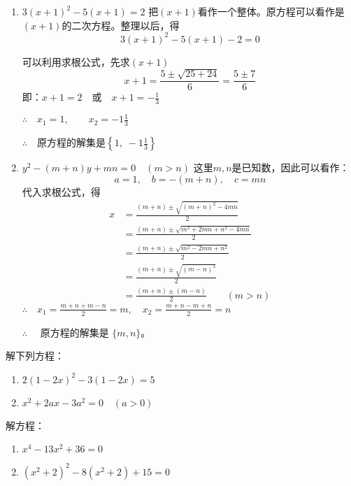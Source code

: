\begin{solution}
\begin{enumerate}
    \item $3(x+1)^2-5(x+1)=2$
    把$(x+1)$看作一个整体。原方程可以看作是
    $(x+1)$的二次方程。整理以后，得
   \[3(x+1)^2-5(x+1)-2=0\] 

   可以利用求根公式，先求$(x+1)$
\[x+1=\frac{5\pm \sqrt{25+24}}{6}=\frac{5\pm 7}{6}\]
即：$x+1=2\quad \text{或}\quad x+1=-\frac{1}{3}$

$\therefore\quad x_1=1,\qquad x_2=-1\frac{1}{3}$

$\therefore\quad$原方程的解集是$\left\{1,\; -1\frac{1}{3}\right\}$

\item $y^2-(m+n)y+mn=0\quad (m>n)$
这里$m,n$是已知数，因此可以看作：
\[a=1,\quad b=-(m+n),\quad c=mn\]
代入求根公式，得
\[\begin{split}
        x &=\frac{(m+n) \pm \sqrt{(m+n)^{2}-4 m n}}{2} \\
        &=\frac{(m+n) \pm \sqrt{m^{2}+2 m n+n^{2}-4 m n}}{2} \\
        &=\frac{(m+n) \pm \sqrt{m^{2}-2 m n+n^{2}}}{2} \\
        &=\frac{(m+n) \pm \sqrt{(m-n)^{2}}}{2}\\
        &=\frac{(m+n) \pm(m-n)}{2} \qquad (m>n)
\end{split}\]
$\therefore\quad x_1=\frac{m+n+m-n}{2}=m,\quad x_2=\frac{m+n-m+n}{2}=n$

$\therefore\quad $ 原方程的解集是 $\{m,n\}$。
    \end{enumerate}
\end{solution}

\begin{ex}
    解下列方程：
    \begin{enumerate}
        \item $2(1-2x)^2-3(1-2x)=5$
        \item $x^2+2ax-3a^2=0\quad  (a>0)$
    \end{enumerate}
\end{ex}


\begin{example}
    解方程：
\begin{enumerate}
    \item $x^4-13x^2+36=0$
    \item $(x^2+2)^2-8(x^2+2)+15=0$
\end{enumerate}
\end{example}

